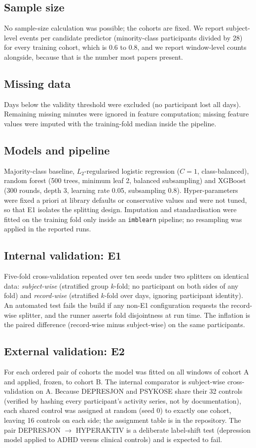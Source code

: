 \documentclass[11pt,a4paper]{article}
\begin{document}
\subsection{Sample size}
No sample-size calculation was possible; the cohorts are fixed. We report subject-level events per
candidate predictor (minority-class participants divided by 28) for every training cohort, which
is 0.6 to 0.8, and we report window-level counts alongside, because that is the number most papers
present.

\subsection{Missing data}
Days below the validity threshold were excluded (no participant lost all days). Remaining
missing minutes were ignored in feature computation; missing feature values were imputed with the
training-fold median inside the pipeline.

\subsection{Models and pipeline}
Majority-class baseline, $L_2$-regularised logistic regression ($C=1$, class-balanced), random
forest (500 trees, minimum leaf 2, balanced subsampling) and XGBoost (300 rounds, depth 3, learning
rate 0.05, subsampling 0.8). Hyper-parameters were fixed a priori at library defaults or
conservative values and were not tuned, so that E1 isolates the splitting design. Imputation and
standardisation were fitted on the training fold only inside an \texttt{imblearn} pipeline; no
resampling was applied in the reported runs.

\subsection{Internal validation: E1}
Five-fold cross-validation repeated over ten seeds under two splitters on identical data:
\emph{subject-wise} (stratified group $k$-fold; no participant on both sides of any fold) and
\emph{record-wise} (stratified $k$-fold over days, ignoring participant identity). An automated
test fails the build if any non-E1 configuration requests the record-wise splitter, and the runner
asserts fold disjointness at run time. The inflation is the paired difference (record-wise minus
subject-wise) on the same participants.

\subsection{External validation: E2}
For each ordered pair of cohorts the model was fitted on all windows of cohort A and applied,
frozen, to cohort B. The internal comparator is subject-wise cross-validation on A. Because
DEPRESJON and PSYKOSE share their 32 controls (verified by hashing every participant's activity
series, not by documentation), each shared control was assigned at random (seed 0) to exactly one
cohort, leaving 16 controls on each side; the assignment table is in the repository. The pair
DEPRESJON $\rightarrow$ HYPERAKTIV is a deliberate label-shift test (depression model applied to ADHD
versus clinical controls) and is expected to fail.
\end{document}
